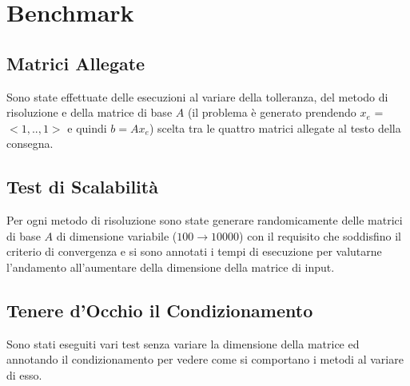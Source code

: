 \documentclass[a4paper,11pt,oneside, table]{article}
\begin{document}
\section{Benchmark}

\subsection{Matrici Allegate}

Sono state effettuate delle esecuzioni al variare della tolleranza, del metodo di risoluzione e della matrice di base $A$ (il problema \`e generato prendendo $x_e$ = $<1,.., 1>$ e quindi $b = Ax_e$) scelta tra le quattro matrici allegate al testo della consegna.

\subsection{Test di Scalabilit\`a}

Per ogni metodo di risoluzione sono state generare randomicamente delle matrici di base $A$ di dimensione variabile ($100 \rightarrow 10000$) con il requisito che soddisfino il criterio di convergenza e si sono annotati i tempi di esecuzione per valutarne l'andamento all'aumentare della dimensione della matrice di input.

\subsection{Tenere d'Occhio il Condizionamento}

Sono stati eseguiti vari test senza variare la dimensione della matrice ed annotando il condizionamento per vedere come si comportano i metodi al variare di esso.

\printbibliography[title={Bibliografia}]
\end{document}
